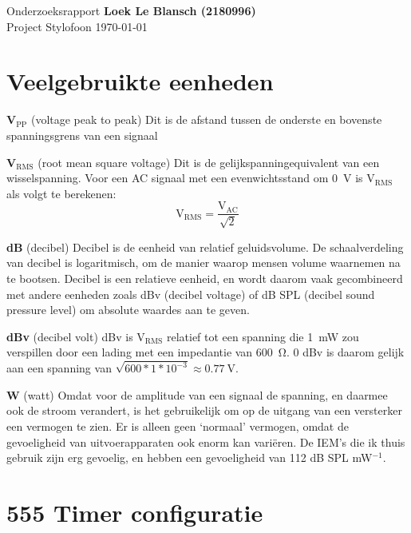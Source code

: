 \documentclass[12pt, a4paper, dutch]{article}
\newcommand{\sub}[1]{$_{\text{#1}}$}
\begin{document}
Onderzoeksrapport \hfill \textbf{Loek Le Blansch (2180996)}\\
Project Stylofoon \hfill \today
\medskip

\tableofcontents

\section{Veelgebruikte eenheden}


\textbf{V\sub{PP}} (voltage peak to peak)
Dit is de afstand tussen de onderste en bovenste spanningsgrens van een signaal

\textbf{V\sub{RMS}} (root mean square voltage)
Dit is de gelijkspanningequivalent van een wisselspanning. Voor een AC signaal
met een evenwichtsstand om \SI{0}{\volt} is V\sub{RMS} als volgt te berekenen:
\[ \text{V}_{\text{RMS}} = \frac{\text{V}_{\text{AC}}}{\sqrt{2}} \]

\textbf{dB} (decibel)
Decibel is de eenheid van relatief geluidsvolume. De schaalverdeling van decibel is
logaritmisch, om de manier waarop mensen volume waarnemen na te bootsen. Decibel is
een relatieve eenheid, en wordt daarom vaak gecombineerd met andere eenheden zoals
dBv (decibel voltage) of dB SPL (decibel sound pressure level) om absolute waardes
aan te geven.

\textbf{dBv} (decibel volt)
dBv is V\sub{RMS} relatief tot een spanning die \SI{1}{\milli\watt} zou verspillen
door een lading met een impedantie van \SI{600}{\ohm}. 0 dBv is daarom gelijk aan een
spanning van $\sqrt{600 * 1 * 10^{-3}} \approx \SI{0.77}{\volt}$.

\textbf{W} (watt)
Omdat voor de amplitude van een signaal de spanning, en daarmee ook de stroom
verandert, is het gebruikelijk om op de uitgang van een versterker een vermogen te
zien. Er is alleen geen `normaal' vermogen, omdat de gevoeligheid van
uitvoerapparaten ook enorm kan vari\"eren. De IEM's die ik thuis gebruik zijn erg
gevoelig, en hebben een gevoeligheid van 112 dB SPL mW$^{-1}$.

\section{555 Timer configuratie}

\end{document}
